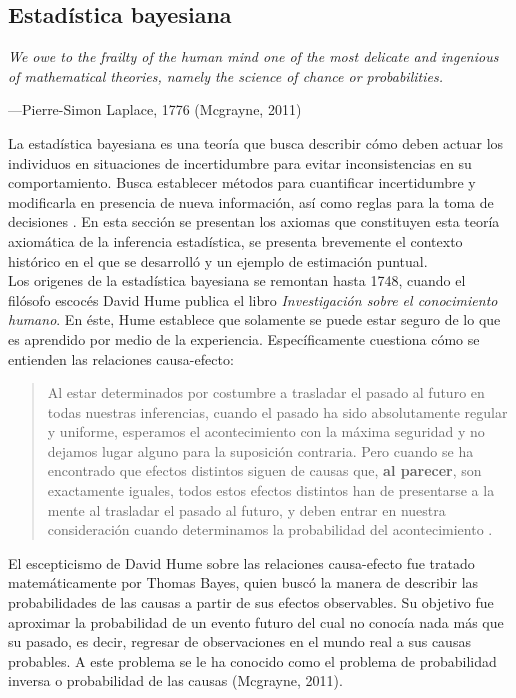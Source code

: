 \documentclass[11pt,a4paper]{article}
\begin{document}
\subsection{Estadística bayesiana}
\label{sec:bayesiana}
\epigraph{\itshape We owe to the frailty of the human mind one of the most delicate and ingenious of mathematical theories, namely the science of chance or probabilities.}{---Pierre-Simon Laplace, 1776 (Mcgrayne, 2011)}

La estadística bayesiana es una teoría que busca describir cómo deben actuar los individuos en situaciones de incertidumbre para evitar inconsistencias en su comportamiento. Busca establecer métodos para cuantificar incertidumbre y modificarla en presencia de nueva información, así como reglas para la toma de decisiones \citep{bernardo}.  En esta sección se presentan los axiomas que constituyen esta teoría axiomática de la inferencia estadística, se presenta brevemente el contexto histórico en el que se desarrolló y un ejemplo de estimación puntual.\\

Los origenes de la estadística bayesiana se remontan hasta 1748, cuando el filósofo escocés David Hume publica el libro \textit{Investigación sobre el conocimiento humano}. En éste, Hume establece que solamente se puede estar seguro de lo que es aprendido por medio de la experiencia. Específicamente cuestiona cómo se entienden las relaciones causa-efecto:

\begin{quotation}
Al estar determinados por costumbre a trasladar el pasado al futuro en todas nuestras inferencias, cuando el pasado ha sido absolutamente regular y uniforme, esperamos el acontecimiento con la máxima seguridad y no dejamos lugar alguno para la suposición contraria. Pero cuando se ha encontrado que efectos distintos siguen de causas que, \textbf{al parecer}, son exactamente iguales, todos estos efectos distintos han de presentarse a la mente al trasladar el pasado al futuro, y deben entrar en nuestra consideración cuando determinamos la probabilidad del acontecimiento \citep{hume}.\\
\end{quotation}

El escepticismo de David Hume sobre las relaciones causa-efecto fue tratado matemáticamente por Thomas Bayes, quien buscó la manera de describir las probabilidades de las causas a partir de sus efectos observables. Su objetivo fue aproximar la probabilidad de un evento futuro del cual no conocía nada más que su pasado, es decir, regresar de observaciones en el mundo real a sus causas probables. A este problema se le ha conocido como el problema de probabilidad inversa o probabilidad de las causas  (Mcgrayne, 2011).\\
\end{document}
